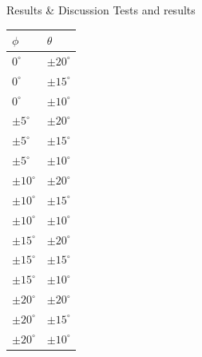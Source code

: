 \documentclass{beamer}
\begin{document}
\begin{frame}{Results \& Discussion }{Tests and results \vphantom{(y}}
\vspace{-0.7em}
\begin{table}
\centering
\begin{tabular}{ l | l}
$\phi$ & $\theta$ \\
\hline
 $0^{\circ}$ & $\pm 20^{\circ}$ \\
 $0^{\circ}$ & $\pm 15^{\circ}$ \\
 $0^{\circ}$ & $\pm 10^{\circ}$ \\
 $\pm 5^{\circ}$ & $\pm 20^{\circ}$ \\
 $\pm 5^{\circ}$ & $\pm 15^{\circ}$ \\
 $\pm 5^{\circ}$ & $\pm 10^{\circ}$ \\
 $\pm 10^{\circ}$ & $\pm 20^{\circ}$ \\
 $\pm 10^{\circ}$ & $\pm 15^{\circ}$ \\
 $\pm 10^{\circ}$ & $\pm 10^{\circ}$ \\
 $\pm 15^{\circ}$ & $\pm 20^{\circ}$ \\
 $\pm 15^{\circ}$ & $\pm 15^{\circ}$ \\
 $\pm 15^{\circ}$ & $\pm 10^{\circ}$ \\
 $\pm 20^{\circ}$ & $\pm 20^{\circ}$ \\
 $\pm 20^{\circ}$ & $\pm 15^{\circ}$ \\
 $\pm 20^{\circ}$ & $\pm 10^{\circ}$
\end{tabular}
\end{table}
\end{frame}
\end{document}
